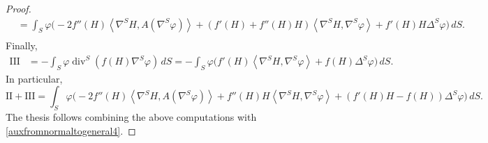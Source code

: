 \documentclass[11pt]{amsart}
\newcommand{\n}[1]{\nabla^\varepsilon_{ #1 }}
\newcommand{\tmc}{{\mathscr{H}}}
\renewcommand{\j}{\mathcal{C}}
\newcommand{\Z}{\mathbf{Z}}
\renewcommand{\n}{\mathbf{N}}
\DeclareMathOperator{\ric}{Ric}
\DeclareMathOperator{\divv}{div}
\DeclareMathOperator{\trace}{trace}
\newcommand{\jacobi}{\mathcal{J}}
\theoremstyle{definition}
\theoremstyle{remark}
\numberwithin{equation}{section}
\begin{document}
\begin{proof}
\begin{equation*}
\begin{split}
     &=\int_S\varphi\Big(-2 f''(H)\left\langle\nabla^S H,A\left(\nabla^S\varphi\right)\right\rangle+\left(f'(H)+f''(H)H\right)\left\langle \nabla^S H,\nabla^S\varphi\right\rangle+f'(H)H\Delta^S\varphi\Big)\,dS.\\
 \end{split}       
    \end{equation*}
    Finally,
    \begin{equation*}
        \begin{split}
            \mathrm{III}&=-\int_S \varphi\divv^S\left( f(H)\nabla^S\varphi\right)\,dS=-\int_S\varphi \Big(f'(H)\left\langle\nabla^S H,\nabla^S\varphi\right\rangle+f(H)\Delta^S\varphi\Big)\,dS.
        \end{split}
    \end{equation*}
    In particular,
    \begin{equation*}
        \mathrm{II}+\mathrm{III}=\int_S\varphi\Big(-2 f''(H)\left\langle\nabla^S H,A\left(\nabla^S\varphi\right)\right\rangle+f''(H)H\left\langle \nabla^S H,\nabla^S\varphi\right\rangle+\left(f'(H)H-f(H)\right)\Delta^S\varphi\Big)\,dS.
    \end{equation*}
The thesis follows combining the above computations with \eqref{auxfromnormaltogeneral4}.
    \end{proof}
\end{document}
